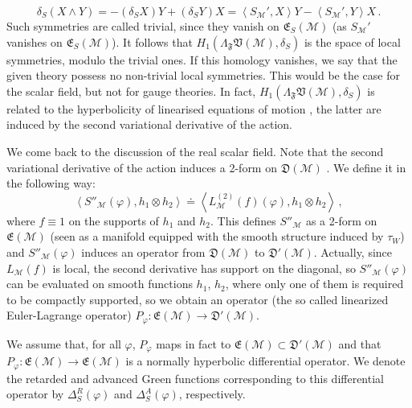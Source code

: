 \documentclass[11pt]{article}
\newcommand{\E}{\mathfrak{E}}
\newcommand{\V}{\mathfrak{V}}
\newcommand{\D}{\mathfrak{D}}
\newcommand{\F}{\mathfrak{F}}
\newcommand{\Mcal}{\mathcal{M}}
\newcommand{\La}{\Lambda}
\newcommand{\ph}{\varphi}
\newcommand{\1}{\mathds{1}}                         %
\begin{document}
{\[\delta_S(X\wedge Y)=-(\delta_SX) Y+(\delta_S Y)X=\left<S_{\mathcal{M}}',X\right>Y-\left<S_{\mathcal{M}}',Y\right>X\,.\]
Such symmetries are called trivial, since they vanish on $\E_S(\Mcal)$ (as $S_{\mathcal{M}}'$ vanishes on $\mathfrak{E}_S(\mathcal{M})$). It follows that $H_1(\La_{\F}\V(\Mcal),\delta_S)$ is the space of local symmetries, modulo the trivial ones. If this homology vanishes, we say that the given theory possess no non-trivial local symmetries. This would be the case for the scalar field, but not for gauge theories. In fact, $H_1(\La_{\F}\V(\Mcal),\delta_S)$ is related to the hyperbolicity of linearised equations of motion \cite{FR}, the latter are induced by the second variational derivative of the action.

We come back to the discussion of the real scalar field. Note that the second variational derivative of the action induces a 2-form on $\D(\Mcal)$ . We define it in the following way:
\[
\left<S''_\Mcal(\ph),h_1\otimes h_2\right>\doteq \left<L^{(2)}_\Mcal(f)(\ph),h_1\otimes h_2\right>\,,
\]
where $f\equiv 1$ on the supports of $h_1$ and $h_2$. This defines $S''_\Mcal$ as a 2-form on $\E(\Mcal)$ (seen as a manifold equipped with the smooth structure induced by $\tau_W$) and $S''_\Mcal(\ph)$ induces an operator from $\D(\Mcal)$ to $\D'(\Mcal)$.
Actually, since $L_\Mcal(f)$ is local, the second derivative has support on the diagonal, so $S''_\Mcal(\ph)$ 
can be evaluated on smooth functions $h_1$, $h_2$, where only one of them is required to be compactly supported, so we obtain an operator (the so called linearized Euler-Lagrange operator) $P_{\varphi}:\E(\Mcal)\rightarrow \D'(\Mcal)$. 

We assume that, for all $\ph$, $P_{\varphi}$ maps in fact to $\E(\Mcal)\subset\D'(\Mcal)$ and that $P_{\varphi}:\E(\Mcal)\rightarrow \E(\Mcal)$ is a normally hyperbolic differential operator. We denote the retarded and advanced Green functions corresponding to this differential operator by $\Delta_S^R(\ph)$ and $\Delta_S^A(\ph)$, respectively. 
}
\end{document}
